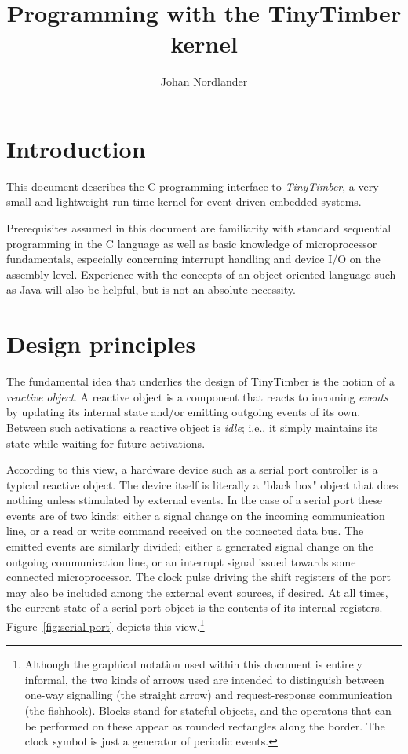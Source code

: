 \documentclass[12pt]{article}
\title{Programming with the TinyTimber kernel}
\author{Johan Nordlander}
\begin{document}
\maketitle

\section{Introduction}

This document describes the C programming interface to {\em TinyTimber}, a very small and lightweight run-time kernel for event-driven embedded systems.  

Prerequisites assumed in this document are familiarity with standard sequential programming in the C language as well as basic knowledge of microprocessor fundamentals, especially concerning interrupt handling and device I/O on the assembly level.  Experience with the concepts of an object-oriented language such as Java will also be helpful, but is not an absolute necessity.

\section{Design principles}
\label{sect:principles}

The fundamental idea that underlies the design of TinyTimber is the notion of a {\em reactive object}.  A reactive object is a component that reacts to incoming {\em events} by updating its internal state and/or emitting outgoing events of its own.  Between such activations a reactive object is {\em idle}; i.e., it simply maintains its state while waiting for future activations.

According to this view, a hardware device such as a serial port controller is a typical reactive object.  The device itself is literally a "black box" object that does nothing unless stimulated by external events.  In the case of a serial port these events are of two kinds: either a signal change on the incoming communication line, or a read or write command received on the connected data bus.  The emitted events are similarly divided; either a generated signal change on the outgoing communication line, or an interrupt signal issued towards some connected microprocessor.  The clock pulse driving the shift registers of the port may also be included among the external event sources, if desired.  At all times, the current state of a serial port object is the contents of its internal registers.  Figure~\ref{fig:serial-port} depicts this view.\footnote{Although the graphical notation used within this document is entirely informal, the two kinds of arrows used are intended to distinguish between one-way signalling (the straight arrow) and request-response communication (the fishhook). Blocks stand for stateful objects, and the operatons that can be performed on these appear as rounded rectangles along the border. The clock symbol is just a generator of periodic events.}
\end{document}
